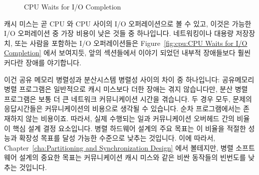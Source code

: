 \begin{figure}[tb]
\centering
{}
\caption{CPU Waits for I/O Completion}
\end{figure}

캐시 미스는 곧 CPU 와 CPU 사이의 I/O 오퍼레이션으로 볼 수 있고, 이것은 가능한
I/O 오퍼레이션 중 가장 비용이 낮은 것들 중 하나입니다.
네트워킹이나 대용량 저장장치, 또는 사람을 포함하는 I/O 오퍼레이션들은
Figure~\ref{fig:cpu:CPU Waits for I/O Completion} 에서 보여지듯, 앞의
섹션들에서 이야기 되었던 내부적 장애들보다 훨씬 커다란 장애를 야기합니다.

이건 공유 메모리 병렬성과 분산시스템 병렬성 사이의 차이 중 하나입니다:
공유메모리 병렬 프로그램은 일반적으로 캐시 미스보다 더한 장애는 겪지
않습니다만, 분산 병렬 프로그램은 보통 더 큰 네트워크 커뮤니케이션 시간을
겪습니다.
두 경우 모두, 문제의 응답시간들은 커뮤니케이션의 비용으로 생각될 수 있습니다.
순차 프로그램에서는 존재하지 않는 비용이죠.
따라서, 실제 수행되는 일과 커뮤니케이션 오버헤드 간의 비율이 핵심 설계 결정
요소입니다.
병렬 하드웨어 설계의 주요 목표는 이 비율을 적절한 성능과 확장성 목표를 달성
가능한 수준으로 낮추는 것입니다.
이에 따라서, Chapter~\ref{cha:Partitioning and Synchronization Design} 에서
볼테지만, 병렬 소프트웨어 설계의 중요한 목표는 커뮤니케이션 캐시 미스와 같은
비싼 동작들의 빈번도를 낮추는 것입니다.

